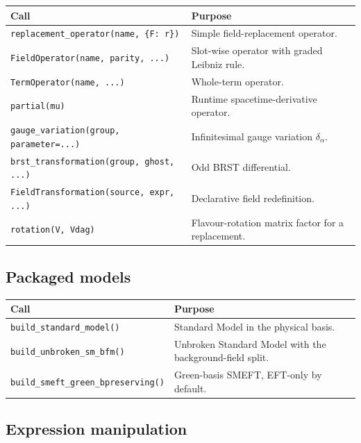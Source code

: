 \begin{center}
\begin{tabular}{@{}P{5.4cm}p{7cm}@{}}
\toprule
\normalfont\textbf{Call} & \textbf{Purpose} \\
\midrule
\texttt{replacement\_operator(name, \{F: r\})} & Simple field-replacement operator. \\
\texttt{FieldOperator(name, parity, ...)} & Slot-wise operator with graded Leibniz rule. \\
\texttt{TermOperator(name, ...)} & Whole-term operator. \\
\texttt{partial(mu)} & Runtime spacetime-derivative operator. \\
\texttt{gauge\_variation(group, parameter=...)} & Infinitesimal gauge variation $\delta_\alpha$. \\
\texttt{brst\_transformation(group, ghost, ...)} & Odd BRST differential. \\
\texttt{FieldTransformation(source, expr, ...)} & Declarative field redefinition. \\
\texttt{rotation(V, Vdag)} & Flavour-rotation matrix factor for a replacement. \\
\bottomrule
\end{tabular}
\end{center}

\subsection*{Packaged models}

\begin{center}
\begin{tabular}{@{}P{5.4cm}p{7cm}@{}}
\toprule
\normalfont\textbf{Call} & \textbf{Purpose} \\
\midrule
\texttt{build\_standard\_model()} & Standard Model in the physical basis. \\
\texttt{build\_unbroken\_sm\_bfm()} & Unbroken Standard Model with the background-field split. \\
\texttt{build\_smeft\_green\_bpreserving()} & Green-basis SMEFT, EFT-only by default. \\
\bottomrule
\end{tabular}
\end{center}

\subsection*{Expression manipulation}

